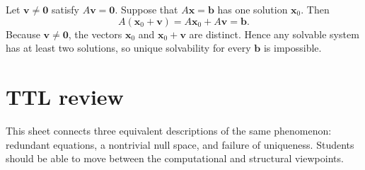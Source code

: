 \begin{coursesolution}
Let $\bm{v}\neq\bm{0}$ satisfy $A\bm{v}=\bm{0}$. Suppose that
$A\bm{x}=\bm{b}$ has one solution $\bm{x}_0$. Then
\[
  A(\bm{x}_0+\bm{v})=A\bm{x}_0+A\bm{v}=\bm{b}.
\]
Because $\bm{v}\neq\bm{0}$, the vectors $\bm{x}_0$ and $\bm{x}_0+\bm{v}$ are
distinct. Hence any solvable system has at least two solutions, so unique solvability
for every $\bm{b}$ is impossible.
\end{coursesolution}

\section{TTL review}

\begin{keypoint}
This sheet connects three equivalent descriptions of the same phenomenon:
redundant equations, a nontrivial null space, and failure of uniqueness.
Students should be able to move between the computational and structural viewpoints.
\end{keypoint}
